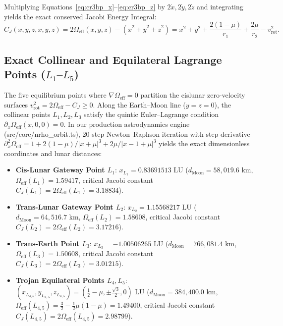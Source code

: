 \documentclass[11pt,a4paper,reqno]{article}
\def\bm#1{#1}%
\def\texttt#1{#1}%
\theoremstyle{plain}
\theoremstyle{definition}
\theoremstyle{remark}
\numberwithin{equation}{section}
\begin{document}
Multiplying Equations~\eqref{eq:cr3bp_x}--\eqref{eq:cr3bp_z} by $2\dot{x}, 2\dot{y}, 2\dot{z}$ and integrating yields the exact conserved Jacobi Energy Integral:
\begin{equation}
  C_J(x, y, z, \dot{x}, \dot{y}, \dot{z}) = 2\Omega_{\text{eff}}(x, y, z) - (\dot{x}^2 + \dot{y}^2 + \dot{z}^2) = x^2 + y^2 + \frac{2(1-\mu)}{r_1} + \frac{2\mu}{r_2} - v_{\text{rot}}^2.
  \label{eq:jacobi_integral}
\end{equation}

\subsection{Exact Collinear and Equilateral Lagrange Points (\texorpdfstring{$L_1$--$L_5$}{L1--L5})}
The five equilibrium points where $\nabla \Omega_{\text{eff}} = \bm{0}$ partition the cislunar zero-velocity surfaces $v_{\text{rot}}^2 = 2\Omega_{\text{eff}} - C_J \ge 0$. Along the Earth--Moon line ($y = z = 0$), the collinear points $L_1, L_2, L_3$ satisfy the quintic Euler--Lagrange condition $\partial_x \Omega_{\text{eff}}(x, 0, 0) = 0$. In our production astrodynamics engine (\texttt{src/core/nrho\_orbit.ts}), 20-step Newton--Raphson iteration with step-derivative $\partial^2_x \Omega_{\text{eff}} = 1 + 2(1-\mu)/|x+\mu|^3 + 2\mu/|x-1+\mu|^3$ yields the exact dimensionless coordinates and lunar distances:
\begin{itemize}[leftmargin=1.8em,itemsep=2pt]
  \item \textbf{Cis-Lunar Gateway Point $L_1$}: $x_{L_1} = 0.83691513\text{ LU}$ ($d_{\text{Moon}} = 58,019.6\text{ km}$, $\Omega_{\text{eff}}(L_1) = 1.59417$, critical Jacobi constant $C_J(L_1) = 2\Omega_{\text{eff}}(L_1) = 3.18834$).
  \item \textbf{Trans-Lunar Gateway Point $L_2$}: $x_{L_2} = 1.15568217\text{ LU}$ ($d_{\text{Moon}} = 64,516.7\text{ km}$, $\Omega_{\text{eff}}(L_2) = 1.58608$, critical Jacobi constant $C_J(L_2) = 2\Omega_{\text{eff}}(L_2) = 3.17216$).
  \item \textbf{Trans-Earth Point $L_3$}: $x_{L_3} = -1.00506265\text{ LU}$ ($d_{\text{Moon}} = 766,081.4\text{ km}$, $\Omega_{\text{eff}}(L_3) = 1.50608$, critical Jacobi constant $C_J(L_3) = 2\Omega_{\text{eff}}(L_3) = 3.01215$).
  \item \textbf{Trojan Equilateral Points $L_4, L_5$}: $(x_{L_{4,5}}, y_{L_{4,5}}, z_{L_{4,5}}) = (\tfrac{1}{2} - \mu, \pm\tfrac{\sqrt{3}}{2}, 0)\text{ LU}$ ($d_{\text{Moon}} = 384,400.0\text{ km}$, $\Omega_{\text{eff}}(L_{4,5}) = \tfrac{3}{2} - \tfrac{1}{2}\mu(1-\mu) = 1.49400$, critical Jacobi constant $C_J(L_{4,5}) = 2\Omega_{\text{eff}}(L_{4,5}) = 2.98799$).
\end{itemize}
\end{document}
